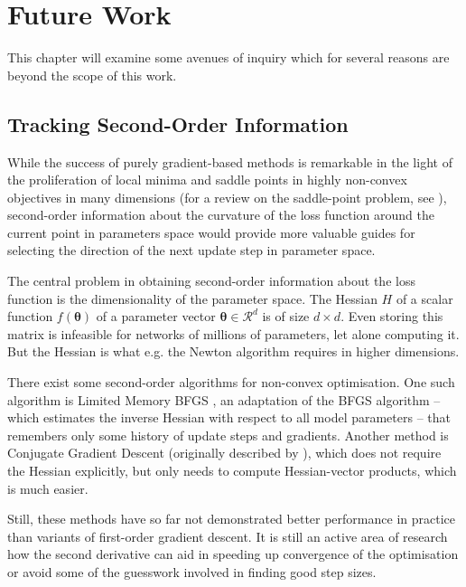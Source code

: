 \chapter{Future Work}%
\label{cha:future_work}

This chapter will examine some avenues of inquiry which for several reasons are
beyond the scope of this work.

\section{Tracking Second-Order Information}%
\label{sec:tracking_second_order_information}

While the success of purely gradient-based methods is remarkable in the
light of the proliferation of local minima and saddle points in highly
non-convex objectives in many dimensions (for a review on the saddle-point problem, see
\citet{dauphin2014identifying}), second-order information about the curvature of
the loss function around the current point in parameters space would provide
more valuable guides for selecting the direction of the next update step in
parameter space.

The central problem in obtaining second-order information about the loss
function is the dimensionality of the parameter space. The Hessian $H$ of a
scalar function $f(\boldsymbol{\theta})$ of a parameter vector $\boldsymbol{\theta} \in
\mathcal{R}^d$ is of size $d\times d$. Even storing this matrix is infeasible
for networks of millions of parameters, let alone computing it.
But the Hessian is what e.g. the Newton algorithm requires in higher dimensions.

There exist some second-order algorithms for non-convex optimisation.  One such
algorithm is Limited Memory BFGS \citep{liu1989limited}, an adaptation of the
BFGS algorithm -- which estimates the inverse Hessian with respect to all model
parameters -- that remembers only some history of update steps and gradients.
Another method is Conjugate Gradient Descent (originally described by
\citet{fletcher1964function}), which does not require the Hessian explicitly,
but only needs to compute Hessian-vector products, which is much easier.

Still, these methods have so far not demonstrated better performance in practice than
variants of first-order gradient descent. It is still an active area of research
how the second derivative can aid in speeding up convergence of the optimisation
or avoid some of the guesswork involved in finding good step sizes.

